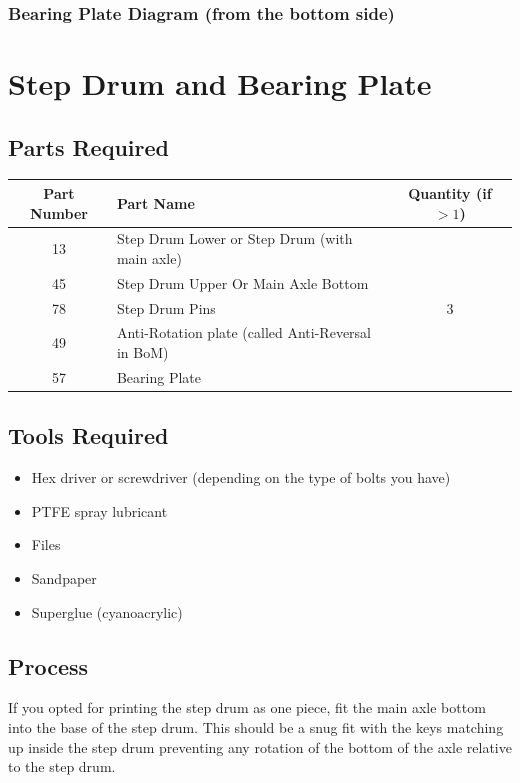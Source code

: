 \documentclass{article}
\begin{document}
\subsubsection{Bearing Plate Diagram (from the bottom side)}



\newpage
\section{Step Drum and Bearing Plate}

\subsection{Parts Required}

\begin{table}[h!]
 \centering
 \begin{tabular}{clc}
    Part Number & Part Name & Quantity (if $>1$) \\ \hline
     13 & Step Drum Lower or Step Drum (with main axle) & \\
     45 & Step Drum Upper Or Main Axle Bottom & \\
     78 & Step Drum Pins & 3 \\
     49 & Anti-Rotation plate (called Anti-Reversal in BoM) & \\
     57 & Bearing Plate & 
 \end{tabular}
\end{table}

\subsection{Tools Required}

\begin{itemize}
 \item Hex driver or screwdriver (depending on the type of bolts you have)
 \item PTFE spray lubricant
 \item Files
 \item Sandpaper
 \item Superglue (cyanoacrylic)
\end{itemize}




\subsection{Process}
If you opted for printing the step drum as one piece, fit the main axle bottom into the base of the
step drum. This should be a snug fit with the keys matching up inside the step drum preventing any
rotation of the bottom of the axle relative to the step drum.
\end{document}

